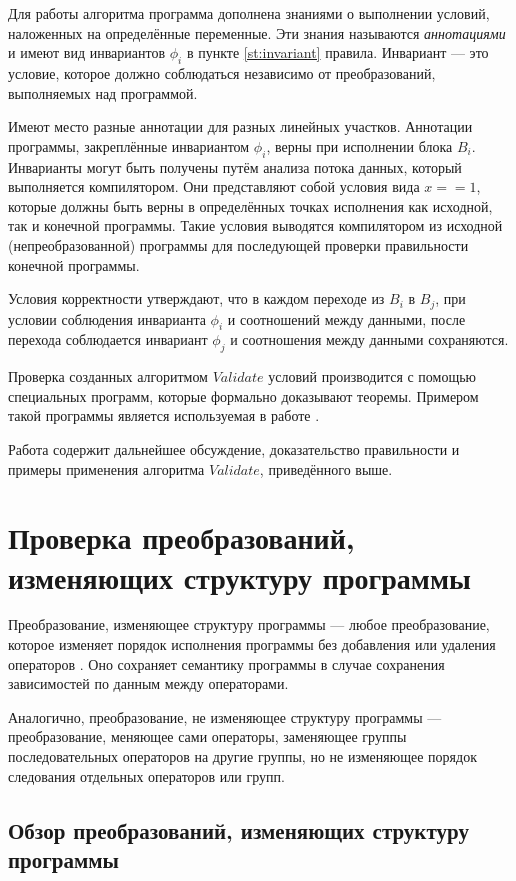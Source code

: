 Для работы алгоритма программа дополнена знаниями о выполнении условий, наложенных на определённые переменные. Эти знания называются \emph{аннотациями} и имеют вид инвариантов $\phi_{i}$ в пункте \ref{st:invariant} правила. Инвариант --- это условие, которое должно соблюдаться независимо от преобразований, выполняемых над программой.

\label{ss:invariants}
Имеют место разные аннотации для разных линейных участков. Аннотации программы, закреплённые инвариантом $\phi_{i}$, верны при исполнении блока $B_{i}$. Инварианты могут быть получены путём анализа потока данных, который выполняется компилятором. Они представляют собой условия вида $x == 1$, которые должны быть верны в определённых точках исполнения как исходной, так и конечной программы. Такие условия выводятся компилятором из исходной (непреобразованной) программы для последующей проверки правильности конечной программы.

Условия корректности утверждают, что в каждом переходе из $B_{i}$ в $B_{j}$, при условии соблюдения инварианта $\phi_{i}$ и соотношений между данными, после перехода соблюдается инвариант $\phi_{j}$ и соотношения между данными сохраняются.

Проверка созданных алгоритмом $Validate$ условий производится с помощью специальных программ, которые формально доказывают теоремы. Примером такой программы является используемая в работе \cite{PRSS99}.

Работа \cite{ZPFG02} содержит дальнейшее обсуждение, доказательство правильности и примеры применения алгоритма $Validate$, приведённого выше.

\section{Проверка преобразований, изменяющих структуру программы}

Преобразование, изменяющее структуру программы --- любое преобразование, которое изменяет порядок исполнения программы без добавления или удаления операторов \cite{Bacon,AK02}. Оно сохраняет семантику программы в случае сохранения зависимостей по данным между операторами.

Аналогично, преобразование, не изменяющее структуру программы --- преобразование, меняющее сами операторы, заменяющее группы последовательных операторов на другие группы, но не изменяющее порядок следования отдельных операторов или групп.

\clearpage

\subsection{Обзор преобразований, изменяющих структуру программы}

